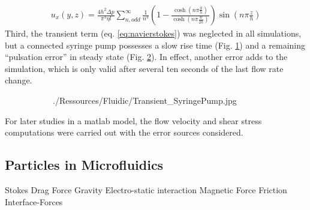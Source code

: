 \begin{align}
 u   _x(y,z) = \frac{4 h^2 \Delta p}{\pi^3 \eta l} \sum_{n,odd}^{\infty} \frac{1}{n^3} \left( 1- \frac{\cosh (n \pi \frac{y}{h})}{\cosh (n \pi \frac{w}{2h})} \right) \sin (n \pi \frac{z}{h}) \label{eq:flowVelocityRect}
\end{align}
Third, the transient term (eq. \ref{eq:navierstokes}) was neglected in all simulations, but a connected syringe pump possesses a slow rise time (Fig. \ref{fig:fluidic:pumpStability:transient}) and a remaining ``pulsation error'' in steady state (Fig. \ref{fig:fluidic:pumpStability:steadystate}). In effect, another error adds to the simulation, which is only valid after several ten seconds of the last flow rate change.

\begin{figure}
	\begin{subfigure}[b]{0.5\textwidth}
		\centering
	    \addtocounter{subfigure}{1}  
		 {./Ressources/Fluidic/Transient_SyringePump.jpg}		
		\addtocounter{subfigure}{-1}  
		\label{fig:fluidic:pumpStability:transient}
	\end{subfigure}%
	\begin{subfigure}[b]{0.5\textwidth}
		\centering
		\addtocounter{subfigure}{1}  
		\addtocounter{subfigure}{-1}  
		\label{fig:fluidic:pumpStability:steadystate}
	\end{subfigure}
\label{fig:fluidic:pumpStability}
\end{figure}

For later studies in a matlab model, the flow velocity and shear stress computations were carried out with the error sources considered. 



\subsection{Particles in Microfluidics}
Stokes Drag Force
Gravity
Electro-static interaction
Magnetic Force
Friction
Interface-Forces
\clearpage
